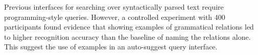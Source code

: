
Previous interfaces for  searching over syntactically parsed text require programming-style queries.
However, a controlled experiment with 400 participants found evidence that showing examples of grammatical relations led to higher recognition accuracy than the baseline of naming the relations alone.  This suggest the use of examples in
an auto-suggest query interface.

